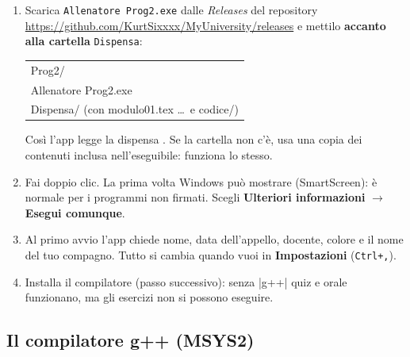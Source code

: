 \begin{passopasso}[: installazione]
\begin{enumerate}
  \item Scarica \texttt{Allenatore Prog2.exe} dalle \emph{Releases} del repository
        \url{https://github.com/KurtSixxxx/MyUniversity/releases} e mettilo \textbf{accanto alla cartella} \texttt{Dispensa}:
        \begin{center}\ttfamily
        \begin{tabular}{l}
        Prog2/ \\
        \quad Allenatore Prog2.exe \\
        \quad Dispensa/ \quad (con modulo01.tex \ldots\ e codice/)
        \end{tabular}
        \end{center}
        Così l'app legge la dispensa . Se la cartella non c'è, usa una copia
        dei contenuti inclusa nell'eseguibile: funziona lo stesso.
  \item Fai doppio clic. La prima volta Windows può mostrare  (SmartScreen): è normale per i programmi non firmati. Scegli \textbf{Ulteriori
        informazioni} $\to$ \textbf{Esegui comunque}.
  \item Al primo avvio l'app chiede nome, data dell'appello, docente, colore e il nome
        del tuo compagno. Tutto si cambia quando vuoi in \textbf{Impostazioni}
        (\texttt{Ctrl+,}).
  \item Installa il compilatore (passo successivo): senza \cc|g++| quiz e orale
        funzionano, ma gli esercizi non si possono eseguire.
\end{enumerate}
\end{passopasso}

\subsection*{Il compilatore g++ (MSYS2)}

